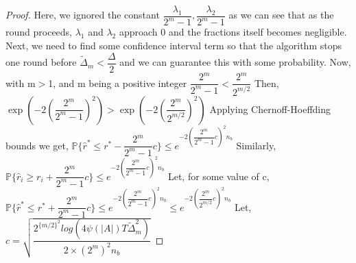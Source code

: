\begin{proof}
\newline
Here, we ignored the constant $\dfrac{\lambda_{1}}{2^{m}-1} , \dfrac{\lambda_{2}}{2^{m}-1}$ as we can see that as the round proceeds, $\lambda_{1}$ and $\lambda_{2}$ approach 0 and the fractions itself becomes negligible.
\newline
Next, we need to find some confidence interval term so that the algorithm stops one round before $\tilde{\Delta}_{m}< \dfrac{\Delta}{2}$ and we can guarantee this with some probability.
\newline
Now, with m$>$1, and m being a positive integer
\newline
\hspace*{8em}$\dfrac{2^{m}}{2^{m}-1} < \dfrac{2^{m}}{2^{m/2}}$
\newline
Then, 
\newline
\hspace*{8em}$\exp(-2(\dfrac{2^{m}}{2^{m}-1})^{2}) > \exp(-2(\dfrac{2^{m}}{2^{m/2}})^{2})$
\newline
Applying Chernoff-Hoeffding bounds we get,
\newline
\hspace*{8em}$\mathbb{P}\lbrace\hat{r}^{*}\leq r^{*} - \dfrac{2^{m}}{2^{m}-1}c \rbrace \leq e^{-2(\dfrac{2^{m}}{2^{m}-1}c)^2 n_{b}}$
\newline
Similarly, $\mathbb{P}\lbrace\hat{r}_{i}\geq r_{i} + \dfrac{2^{m}}{2^{m}-1}c \rbrace \leq e^{-2(\dfrac{2^{m}}{2^{m}-1}c)^2 n_{b}}$
\newline
Let, for some value of c,
\newline
\hspace*{8em}$\mathbb{P}\lbrace\hat{r}^{*}\leq r^{*} + \dfrac{2^{m}}{2^{m}-1}c \rbrace \leq e^{-2(\dfrac{2^{m}}{2^{m}-1}c)^2 n_{b}} \leq e^{-2(\dfrac{2^{m}}{2^{m/2}}c)^{2} n_{b}}$
\newline
Let, 
$c=\sqrt{\dfrac{2^{\lbrace{m/2}\rbrace^{2}} log({4\psi(|A|)T\tilde{\Delta}_{m}^{2}})}{2\times(2^{m})^{2}n_{b}}}$
\newline

\end{proof}

